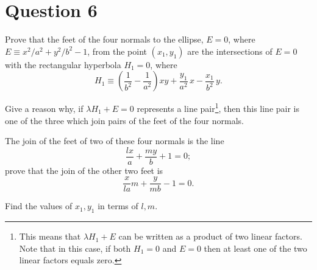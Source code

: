 \documentclass[11pt,a4paper]{report}
\theoremstyle{plain}
\theoremstyle{definition}
\begin{document}
\newpage
\section*{Question 6}

Prove that the feet of the four normals to the ellipse, $ E=0 $, where $ E \equiv x^2/a^2  +   y^2/b^2 -1 $, from the point $ (x_1,y_1) $ are the intersections of $ E=0 $ with the rectangular hyperbola $ H_1 = 0 $, where
\[
H_1 \equiv \left( \frac{1}{b^2} - \frac{1}{a^2} \right) xy + \frac{y_1}{a^2}\, x - \frac{x_1}{b^2}\, y .
\]

Give a reason why, if $ \lambda H_1 + E = 0 $ represents a line pair\footnote{This means that $  \lambda H_1 + E   $ can be written as a product of two linear factors.  Note that in this case,  if both $  H_1 =0 $ and $  E  =0 $ then  at least one of the two linear factors equals zero.}, then this line pair is one of the three which join pairs of the feet of the four normals.

The join of the feet of two of these four normals is the line
\[
\frac{l x}{a} + \frac{my}{b} + 1 = 0 ;
\]
prove that the join of the other two feet is 
\[
\frac{x}{la}m+ \frac{y}{mb} - 1 = 0.
\]

Find the values of $ x_1, y_1 $ in terms of $ l,m $.
\end{document}
